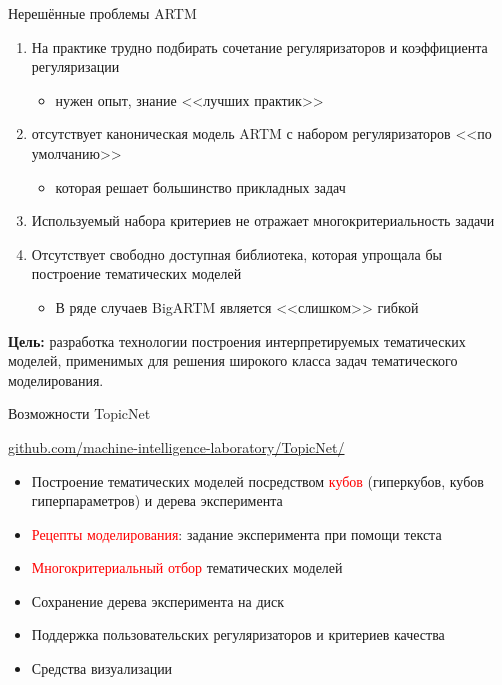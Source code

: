 \begin{frame}[t]{Нерешённые проблемы ARTM}

\begin{enumerate}
    \item{На практике трудно подбирать сочетание регуляризаторов и коэффициента регуляризации \begin{itemize}
        \item {нужен опыт, знание <<лучших практик>>}
    \end{itemize}}
    \item{ отсутствует каноническая модель ARTM с набором регуляризаторов <<по умолчанию>> \begin{itemize}
        \item {которая решает большинство прикладных задач}
    \end{itemize}}
    \item{ Используемый набора критериев не отражает многокритериальность задачи}
    \item{Отсутствует свободно доступная библиотека, которая упрощала бы построение тематических моделей \begin{itemize}
        \item {В ряде случаев BigARTM является <<слишком>> гибкой}
    \end{itemize}}
\end{enumerate}
\textbf{Цель:} разработка технологии построения интерпретируемых  тематических моделей, применимых для решения широкого класса задач тематического моделирования.

\end{frame}




\begin{frame}{Возможности TopicNet}

\textcolor{blue}{\url{github.com/machine-intelligence-laboratory/TopicNet/}}
\bigskip
\begin{itemize}
    \item{Построение тематических моделей посредством \textcolor{red}{кубов} (гиперкубов, кубов гиперпараметров) и дерева эксперимента}
    \item{\textcolor{red}{Рецепты моделирования}: задание эксперимента при помощи текста}
    \item{\textcolor{red}{Многокритериальный отбор} тематических моделей}
    \item{Сохранение дерева эксперимента на диск}
    \item{Поддержка пользовательских регуляризаторов и критериев качества}
    \item{Средства визуализации}
\end{itemize}
\end{frame}


